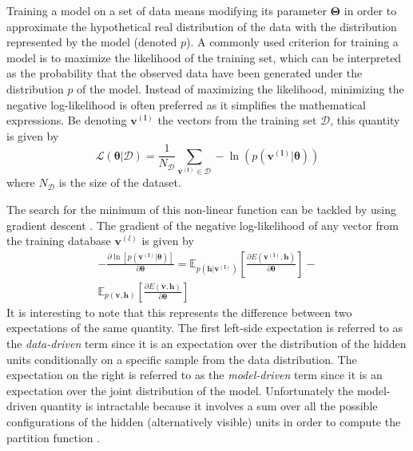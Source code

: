 \documentclass[letterpaper]{article}
\begin{document}
Training a model on a set of data means modifying its parameter $\bm{\Theta}$ in order to approximate the hypothetical real distribution of the data with the distribution represented by the model (denoted $p$).
A commonly used criterion for training a model is to maximize the likelihood of the training set, which can be interpreted as the probability that the observed data have been generated under the distribution $p$ of the model.
Instead of maximizing the likelihood, minimizing the negative log-likelihood is often preferred as it simplifies the mathematical expressions. Be denoting $\bm{v^{(l)}}$ the vectors from the training set $\mathcal{D}$, this quantity is given by
\begin{equation}
\label{eq:likelihood}
\mathcal{L(\bm{\theta}|\mathcal{D})}  = \frac{1}{N_{\mathcal{D}}} \sum_{\bm{v^{(l)}} \in \mathcal{D}} - \ln \left( p(\bm{v^{(l)}}|\bm{\theta})\right)
\end{equation}
where $N_{\mathcal{D}}$ is the size of the dataset. 

The search for the minimum of this non-linear function can be tackled by using gradient descent \cite{bottou2010large}. The gradient of the negative log-likelihood of any vector from the training database $\bm{v}^{(l)}$ is given by
\begin{equation}
\label{eq:loglik}
\begin{split}
- \frac{\partial \ln \left[ p(\bm{v^{(l)}}|\bm{\theta})\right]}{\partial \bm{\theta}} 
= 
\mathbb{E}_{p(\bm{h}|\bm{v^{(l)}})} \left[ \frac{\partial E(\bm{v^{(l)}},\bm{h})}{\partial \bm{\theta}} \right] 
- \\
\mathbb{E}_{p(\bm{v} , \bm{h})} \left[ \frac{\partial E(\bm{v},\bm{h})}{\partial \bm{\theta}} \right]
\end{split}
\end{equation}
It is interesting to note that this represents the difference between two expectations of the same quantity. The first left-side expectation is referred to as the \textit{data-driven} term since it is an expectation over the distribution of the hidden units conditionally on a specific sample from the data distribution. The expectation on the right is referred to as the \textit{model-driven} term since it is an expectation over the joint distribution of the model.
Unfortunately the model-driven quantity is intractable because it involves a sum over all the possible configurations of the hidden (alternatively visible) units in order to compute the partition function \cite{Fischer2012}.
\end{document}

